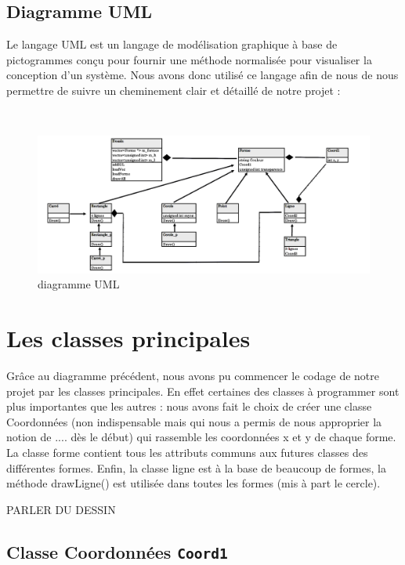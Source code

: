 \documentclass[11pt]{article}
\begin{document}
\clearpage

\subsection{Diagramme UML}
Le langage UML est un langage de modélisation graphique à base de pictogrammes conçu pour fournir une méthode normalisée pour visualiser la conception d'un système. Nous avons donc utilisé ce langage afin de nous de nous permettre de suivre un cheminement clair et détaillé de notre projet :

\
\

\begin{figure}[!htbp]
    \begin{center}
        \includegraphics[width=20cm]{Photo2.png}
        \caption{diagramme UML}
    \centering
    \end{center}
\end{figure}

\section{Les classes principales}

Grâce au diagramme précédent, nous avons pu commencer le codage de notre projet par les classes principales. En effet certaines des classes à programmer sont plus importantes que les autres : nous avons fait le choix de créer une classe Coordonnées (non indispensable mais qui nous a permis de nous approprier la notion de .... dès le début) qui rassemble les coordonnées x et y de chaque forme. La classe forme contient tous les attributs communs aux futures classes des différentes formes. Enfin, la classe ligne est à la base de beaucoup de formes, la méthode drawLigne() est utilisée dans toutes les formes (mis à part le cercle).

PARLER DU DESSIN

\subsection{Classe Coordonnées \texttt{Coord1}}
\end{document}
